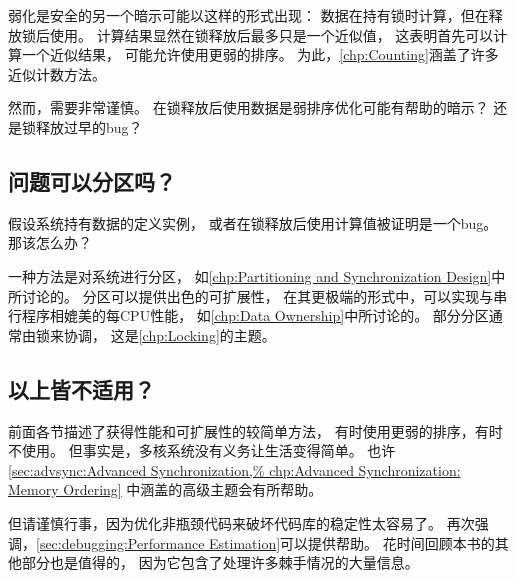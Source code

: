 弱化是安全的另一个暗示可能以这样的形式出现：
数据在持有锁时计算，但在释放锁后使用。
计算结果显然在锁释放后最多只是一个近似值，
这表明首先可以计算一个近似结果，
可能允许使用更弱的排序。
为此，\cref{chp:Counting}涵盖了许多近似计数方法。

然而，需要非常谨慎。
在锁释放后使用数据是弱排序优化可能有帮助的暗示？
还是锁释放过早的bug？

\subsection{问题可以分区吗？}
\label{sec:app:questions:Is the Problem Partitionable?}

假设系统持有数据的定义实例，
或者在锁释放后使用计算值被证明是一个bug。
那该怎么办？

一种方法是对系统进行分区，
如\cref{chp:Partitioning and Synchronization Design}中所讨论的。
分区可以提供出色的可扩展性，
在其更极端的形式中，可以实现与串行程序相媲美的每CPU性能，
如\cref{chp:Data Ownership}中所讨论的。
部分分区通常由锁来协调，
这是\cref{chp:Locking}的主题。

\subsection{以上皆不适用？}
\label{sec:app:questions:None of the Above?}

前面各节描述了获得性能和可扩展性的较简单方法，
有时使用更弱的排序，有时不使用。
但事实是，多核系统没有义务让生活变得简单。
也许\cref{sec:advsync:Advanced Synchronization,%
chp:Advanced Synchronization: Memory Ordering}
中涵盖的高级主题会有所帮助。

但请谨慎行事，因为优化非瓶颈代码来破坏代码库的稳定性太容易了。
再次强调，\cref{sec:debugging:Performance Estimation}可以提供帮助。
花时间回顾本书的其他部分也是值得的，
因为它包含了处理许多棘手情况的大量信息。
